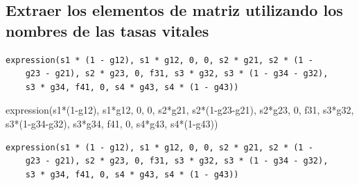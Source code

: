 \documentclass[
  12pt,
  letterpaper,
]{book}
\newenvironment{Shaded}{\begin{snugshade}}{\end{snugshade}}
\newcommand{\AttributeTok}[1]{\textcolor[rgb]{0.40,0.45,0.13}{#1}}
\newcommand{\DecValTok}[1]{\textcolor[rgb]{0.68,0.00,0.00}{#1}}
\newcommand{\FunctionTok}[1]{\textcolor[rgb]{0.28,0.35,0.67}{#1}}
\newcommand{\NormalTok}[1]{\textcolor[rgb]{0.00,0.23,0.31}{#1}}
\newcommand{\OtherTok}[1]{\textcolor[rgb]{0.00,0.23,0.31}{#1}}
\newcommand{\SpecialCharTok}[1]{\textcolor[rgb]{0.37,0.37,0.37}{#1}}
\begin{document}
\subsection{Extraer los elementos de matriz utilizando los nombres de
las tasas
vitales}\label{extraer-los-elementos-de-matriz-utilizando-los-nombres-de-las-tasas-vitales}

\begin{Shaded}
\end{Shaded}

\begin{verbatim}
expression(s1 * (1 - g12), s1 * g12, 0, 0, s2 * g21, s2 * (1 - 
    g23 - g21), s2 * g23, 0, f31, s3 * g32, s3 * (1 - g34 - g32), 
    s3 * g34, f41, 0, s4 * g43, s4 * (1 - g43))
\end{verbatim}

\begin{Shaded}
\begin{Highlighting}[]
\FunctionTok{expression}\NormalTok{(s1}\SpecialCharTok{*}\NormalTok{(}\DecValTok{1}\SpecialCharTok{{-}}\NormalTok{g12), s1}\SpecialCharTok{*}\NormalTok{g12, }\DecValTok{0}\NormalTok{, }\DecValTok{0}\NormalTok{, }
\NormalTok{           s2}\SpecialCharTok{*}\NormalTok{g21, s2}\SpecialCharTok{*}\NormalTok{(}\DecValTok{1}\SpecialCharTok{{-}}\NormalTok{g23}\SpecialCharTok{{-}}\NormalTok{g21), s2}\SpecialCharTok{*}\NormalTok{g23, }\DecValTok{0}\NormalTok{, }
\NormalTok{          f31, s3}\SpecialCharTok{*}\NormalTok{g32, s3}\SpecialCharTok{*}\NormalTok{(}\DecValTok{1}\SpecialCharTok{{-}}\NormalTok{g34}\SpecialCharTok{{-}}\NormalTok{g32), s3}\SpecialCharTok{*}\NormalTok{g34, }
\NormalTok{          f41, }\DecValTok{0}\NormalTok{, s4}\SpecialCharTok{*}\NormalTok{g43, s4}\SpecialCharTok{*}\NormalTok{(}\DecValTok{1}\SpecialCharTok{{-}}\NormalTok{g43))}
\end{Highlighting}
\end{Shaded}

\begin{verbatim}
expression(s1 * (1 - g12), s1 * g12, 0, 0, s2 * g21, s2 * (1 - 
    g23 - g21), s2 * g23, 0, f31, s3 * g32, s3 * (1 - g34 - g32), 
    s3 * g34, f41, 0, s4 * g43, s4 * (1 - g43))
\end{verbatim}
\end{document}
